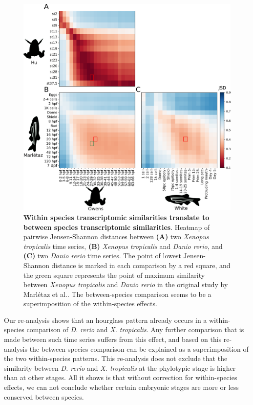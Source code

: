 \begin{figure}[H]
    \includegraphics[width=\linewidth]{ch.hourglass/images/between_experiment.png}
    \caption{\textbf{Within species transcriptomic similarities translate to between species transcriptomic similarities}. Heatmap of pairwise Jensen-Shannon distances between \textbf{(A)} two \textit{Xenopus tropicalis} time series, \textbf{(B)} \textit{Xenopus tropicalis} and \textit{Danio rerio}, and \textbf{(C)} two \textit{Danio rerio} time series. The point of lowest Jensen-Shannon distance is marked in each comparison by a red square, and the green square represents the point of maximum similarity between \textit{Xenopus tropicalis} and \textit{Danio rerio} in the original study by Marl\'etaz et al.\cite{marletaz2018}. The between-species comparison seems to be a superimposition of the within-species effects.}
    \label{fig:betweenexperiment}
\end{figure}

Our re-analysis shows that an hourglass pattern already occurs in a within-species comparison of \textit{D. rerio} and \textit{X. tropicalis}. Any further comparison that is made between such time series suffers from this effect, and based on this re-analysis the between-species comparison can be explained as a superimposition of the two within-species patterns. This re-analysis does not exclude that the similarity between \textit{D. rerio} and \textit{X. tropicalis} at the phylotypic stage is higher than at other stages. All it shows is that without correction for within-species effects, we can not conclude whether certain embryonic stages are more or less conserved between species.

